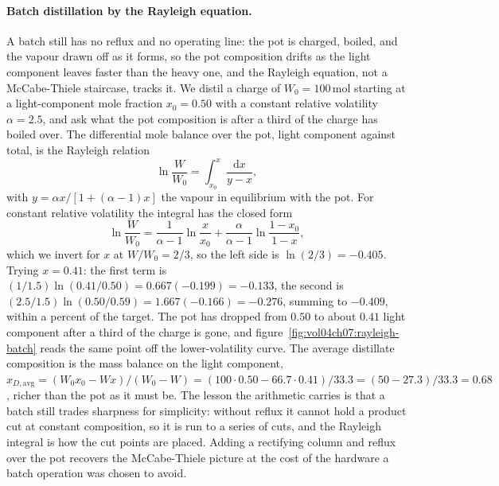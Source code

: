 \paragraph{Batch distillation by the Rayleigh equation.} A batch still has no
reflux and no operating line: the pot is charged, boiled, and the vapour drawn
off as it forms, so the pot composition drifts as the light component leaves
faster than the heavy one, and the Rayleigh equation, not a McCabe-Thiele
staircase, tracks it. We distil a charge of $W_0 = 100\,\text{mol}$ starting at
a light-component mole fraction $x_0 = 0.50$ with a constant relative volatility
$\alpha = 2.5$, and ask what the pot composition is after a third of the charge
has boiled over. The differential mole balance over the pot, light component
against total, is the Rayleigh relation
\[
\ln\!\frac{W}{W_0} = \int_{x_0}^{x}\frac{\mathrm{d}x}{y - x},
\]
with $y = \alpha x/[1+(\alpha-1)x]$ the vapour in equilibrium with the pot. For
constant relative volatility the integral has the closed form
\[
\ln\!\frac{W}{W_0} = \frac{1}{\alpha-1}\ln\!\frac{x}{x_0} +
\frac{\alpha}{\alpha-1}\ln\!\frac{1-x_0}{1-x},
\]
which we invert for $x$ at $W/W_0 = 2/3$, so the left side is $\ln(2/3) =
-0.405$. Trying $x = 0.41$: the first term is $(1/1.5)\ln(0.41/0.50) =
0.667(-0.199) = -0.133$, the second is $(2.5/1.5)\ln(0.50/0.59) =
1.667(-0.166) = -0.276$, summing to $-0.409$, within a percent of the target.
The pot has dropped from $0.50$ to about $0.41$ light component after a third of
the charge is gone, and figure~\ref{fig:vol04ch07:rayleigh-batch} reads the
same point off the lower-volatility curve. The average distillate composition
is the mass balance on the light component, $x_{D,\text{avg}} = (W_0 x_0 -
W x)/(W_0 - W) = (100\cdot 0.50 - 66.7\cdot 0.41)/33.3 = (50 - 27.3)/33.3 =
0.68$, richer than the pot as it must be. The lesson the arithmetic carries is
that a batch still trades sharpness for simplicity: without reflux it cannot
hold a product cut at constant composition, so it is run to a series of cuts,
and the Rayleigh integral is how the cut points are placed. Adding a rectifying
column and reflux over the pot recovers the McCabe-Thiele picture at the cost of
the hardware a batch operation was chosen to avoid.



